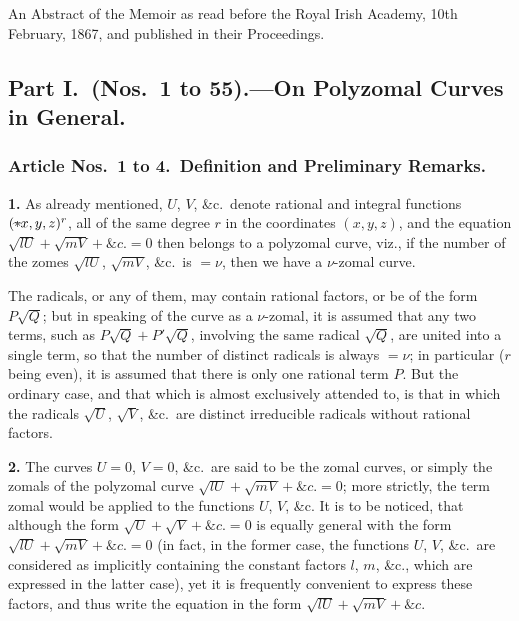 \documentclass[11pt,a4paper]{article}
\theoremstyle{definition}
\begin{document}
An Abstract of the Memoir as read before the Royal Irish Academy, 10th February, 1867, and published in their Proceedings.

\setcounter{page}{472}

\subsection*{Part I.\ (Nos.\ 1 to 55).---On Polyzomal Curves in General.}

\subsubsection*{Article Nos.\ 1 to 4.\ Definition and Preliminary Remarks.}

\noindent\textbf{1.} As already mentioned, $U$, $V$, \&c.\ denote rational and integral functions $({*}\!\hbox{\hspace{-0.5em}}\raisebox{0.3ex}{$\scriptstyle\frown$}\!x,y,z)^r$, all of the same degree $r$ in the coordinates $(x,y,z)$, and the equation $\sqrt{lU}+\sqrt{mV}+\&c.=0$ then belongs to a polyzomal curve, viz., if the number of the zomes $\sqrt{lU}$, $\sqrt{mV}$, \&c.\ is $=\nu$, then we have a $\nu$-zomal curve.

The radicals, or any of them, may contain rational factors, or be of the form $P\sqrt{Q}$; but in speaking of the curve as a $\nu$-zomal, it is assumed that any two terms, such as $P\sqrt{Q}+P'\sqrt{Q}$, involving the same radical $\sqrt{Q}$, are united into a single term, so that the number of distinct radicals is always $=\nu$; in particular ($r$ being even), it is assumed that there is only one rational term $P$. But the ordinary case, and that which is almost exclusively attended to, is that in which the radicals $\sqrt{U}$, $\sqrt{V}$, \&c.\ are distinct irreducible radicals without rational factors.

\noindent\textbf{2.} The curves $U=0$, $V=0$, \&c.\ are said to be the zomal curves, or simply the zomals of the polyzomal curve $\sqrt{lU}+\sqrt{mV}+\&c.=0$; more strictly, the term zomal would be applied to the functions $U$, $V$, \&c. It is to be noticed, that although the form $\sqrt{U}+\sqrt{V}+\&c.=0$ is equally general with the form $\sqrt{lU}+\sqrt{mV}+\&c.=0$ (in fact, in the former case, the functions $U$, $V$, \&c.\ are considered as implicitly containing the constant factors $l$, $m$, \&c., which are expressed in the latter case), yet it is frequently convenient to express these factors, and thus write the equation in the form $\sqrt{lU}+\sqrt{mV}+\&c.$
\end{document}
